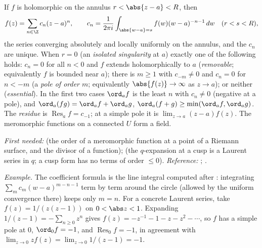 \begin{theorem}\label{thm:prereq:laurent}
If $f$ is holomorphic on the annulus $r<\abs{z-a}<R$, then
\[
f(z)=\sum_{n\in\Z}c_n(z-a)^n,\qquad c_n=\frac1{2\pi i}\int_{\abs{w-a}=s}f(w)(w-a)^{-n-1}\,dw
\quad(r<s<R),
\]
the series converging absolutely and locally uniformly on the annulus, and the $c_n$ are unique.
When $r=0$ (an \emph{isolated singularity} at $a$) exactly one of the following holds: $c_n=0$ for
all $n<0$ and $f$ extends holomorphically to $a$ (\emph{removable}; equivalently $f$ is bounded
near $a$); there is $m\ge1$ with $c_{-m}\ne0$ and $c_n=0$ for $n<-m$ (a \emph{pole of order $m$};
equivalently $\abs{f(z)}\to\infty$ as $z\to a$); or neither (\emph{essential}). In the first two
cases $\ord_af$ is the least $n$ with $c_n\ne0$ (negative at a pole), and
$\ord_a(fg)=\ord_af+\ord_ag$, $\ord_a(f+g)\ge\min(\ord_af,\ord_ag)$. The \emph{residue} is
$\operatorname{Res}_af=c_{-1}$; at a simple pole it is $\lim_{z\to a}(z-a)f(z)$. The meromorphic
functions on a connected $U$ form a field.
\end{theorem}
\noindent\emph{First needed:}  (the order of a meromorphic function at a point of a
Riemann surface, and the divisor of a function);  (the $q$-expansion at a cusp is
a Laurent series in $q$; a cusp form has no terms of order $\le0$). \emph{Reference:}
\cite[Chapter 5, Section 1]{Ahlfors79}; \cite[Chapter 3]{SteinShakarchi03}.

\emph{Example.} The coefficient formula is the line integral computed after
: integrating $\sum_mc_m(w-a)^{m-n-1}$ term by term around the circle
(allowed by the uniform convergence there) keeps only $m=n$. For a concrete Laurent series, take
$f(z)=1/(z(z-1))$ on $0<\abs z<1$. Expanding $1/(z-1)=-\sum_{n\ge0}z^n$ gives
$f(z)=-z^{-1}-1-z-z^2-\cdots$, so $f$ has a simple pole at $0$, $\ord_0f=-1$, and
$\operatorname{Res}_0f=-1$, in agreement with $\lim_{z\to0}zf(z)=\lim_{z\to0}1/(z-1)=-1$.

